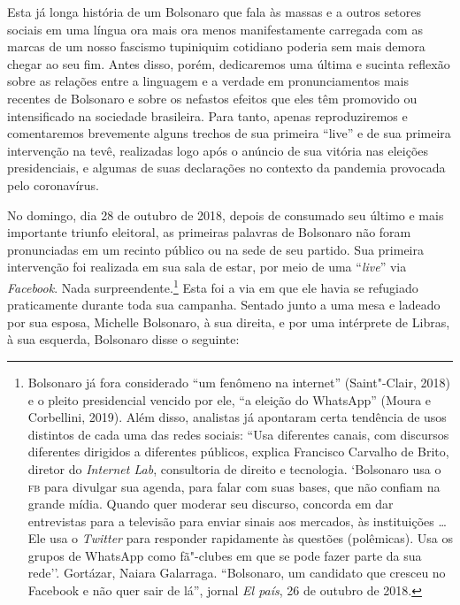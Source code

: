 Esta já longa história de um Bolsonaro que fala às massas e a outros
setores sociais em uma língua ora mais ora menos manifestamente
carregada com as marcas de um nosso fascismo tupiniquim cotidiano
poderia sem mais demora chegar ao seu fim. Antes disso, porém,
dedicaremos uma última e sucinta reflexão sobre as relações entre a
linguagem e a verdade em pronunciamentos mais recentes de Bolsonaro e
sobre os nefastos efeitos que eles têm promovido ou intensificado na
sociedade brasileira. Para tanto, apenas reproduziremos e comentaremos
brevemente alguns trechos de sua primeira ``live'' e de sua primeira
intervenção na tevê, realizadas logo após o anúncio de sua vitória nas
eleições presidenciais, e algumas de suas declarações no contexto da
pandemia provocada pelo coronavírus.

No domingo, dia 28 de outubro de 2018, depois de consumado seu último e
mais importante triunfo eleitoral, as primeiras palavras de Bolsonaro
não foram pronunciadas em um recinto público ou na sede de seu partido.
Sua primeira intervenção foi realizada em sua sala de estar, por meio de
uma ``\emph{live}'' via \emph{Facebook}. Nada surpreendente.\footnote{Bolsonaro
  já fora considerado ``um fenômeno na internet'' (Saint"-Clair, 2018) e
  o pleito presidencial vencido por ele, ``a eleição do WhatsApp''
  (Moura e Corbellini, 2019). Além disso, analistas já apontaram certa
  tendência de usos distintos de cada uma das redes sociais: ``Usa
  diferentes canais, com discursos diferentes dirigidos a diferentes
  públicos, explica Francisco Carvalho de Brito, diretor do
  \emph{Internet Lab}, consultoria de direito e tecnologia. `Bolsonaro
  usa o \textsc{fb} para divulgar sua agenda, para falar com suas bases,
  que não confiam na grande mídia. Quando quer moderar seu discurso,
  concorda em dar entrevistas para a televisão para enviar sinais aos
  mercados, às instituições \ldots{} Ele usa o \emph{Twitter} para responder
  rapidamente às questões (polêmicas). Usa os grupos de WhatsApp como
  fã"-clubes em que se pode fazer parte da sua rede''. Gortázar, Naiara
  Galarraga. ``Bolsonaro, um candidato que cresceu no Facebook e não quer
  sair de lá'', jornal \emph{El país}, 26 de outubro de 2018.}
Esta foi a via em que ele havia se refugiado praticamente durante toda
sua campanha. Sentado junto a uma mesa e ladeado por sua esposa,
Michelle Bolsonaro, à sua direita, e por uma intérprete de Libras, à sua
esquerda, Bolsonaro disse o seguinte:

